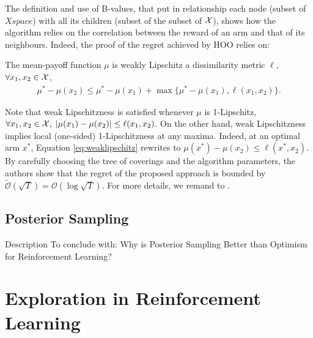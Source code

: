 The definition and use of B-values, that put in relationship each node (subset of $Xspace$) with all its children (subset of the subset of $\mathcal{X}$), shows how the algorithm relies on the correlation between the reward of an arm and that of its neighbours. Indeed, the proof of the regret achieved by \gls{HOO} relies on:

\begin{assumption}
The mean-payoff function $\mu$ is weakly Lipschitz \wrt a dissimilarity metric $\ell$, \ie $\forall x_1,x_2\in\mathcal{X}$,
\begin{align}
\mu^*-\mu(x_2)\leq\mu^* - \mu(x_1)+\max\{\mu^* - \mu(x_1), \ell(x_1,x_2)\}. \label{eq:weaklipschitz}
\end{align}
\end{assumption}

Note that weak Lipschitzness is satisfied whenever $\mu$ is 1-Lipschitz, \ie $\forall x_1,x_2\in\mathcal{X}, \; |\mu(x_1)-\mu(x_2)|\leq\ell(x_1,x_2)$. On the other hand, weak Lipschitzness implies local (one-sided) 1-Lipschitzness at any maxima. Indeed, at an optimal arm $x^*$, Equation \ref{eq:weaklipschitz} rewrites to $\mu(x^*)-\mu(x_2)\leq\ell(x^*,x_2)$. \\
By carefully choosing the tree of coverings and the algorithm parameters, the authors show that the regret of the proposed approach is bounded by $\widetilde{\mathcal{O}}(\sqrt{T}) = \mathcal{O}(\log\sqrt{T})$. For more details, we remand to \cite{bubeck2011x}.




\subsection{Posterior Sampling}
Description
To conclude with: Why is Posterior Sampling Better than Optimism for Reinforcement Learning? \cite{osband2017posterior}

\section{Exploration in Reinforcement Learning}

